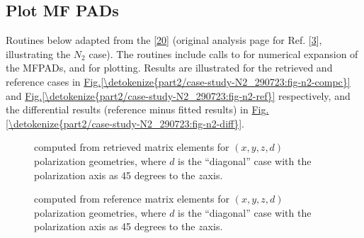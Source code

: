 \documentclass[letterpaper,table,10pt,english]{jupyterBook}
\begin{document}
\subsection{Plot MF PADs}
\label{\detokenize{part2/case-study-OCS_290723:plot-mf-pads}}
\sphinxAtStartPar
Routines below adapted from the  {[}\hyperlink{cite.backmatter/bibliography:id681}{20}{]}  (original analysis page for Ref. {[}\hyperlink{cite.backmatter/bibliography:id686}{3}{]}, illustrating the \(N_2\) case). The routines include calls to  for numerical expansion of the MF\sphinxhyphen{}PADs, and  for plotting. Results are illustrated for the retrieved and reference cases in \hyperref[\detokenize{part2/case-study-N2_290723:fig-n2-compc}]{Fig.\@ \ref{\detokenize{part2/case-study-N2_290723:fig-n2-compc}}} and \hyperref[\detokenize{part2/case-study-N2_290723:fig-n2-ref}]{Fig.\@ \ref{\detokenize{part2/case-study-N2_290723:fig-n2-ref}}} respectively, and the differential results (reference minus fitted results) in \hyperref[\detokenize{part2/case-study-N2_290723:fig-n2-diff}]{Fig.\@ \ref{\detokenize{part2/case-study-N2_290723:fig-n2-diff}}}.

\begin{figure}[htbp]
\centering
\capstart

\noindent{}
\caption{{\hyperref[\detokenize{backmatter/glossary:term-MF}]{}} computed from retrieved matrix elements for \((x,y,z,d)\) polarization geometries, where \(d\) is the “diagonal” case with the polarization axis as 45 degrees to the \(z\)\sphinxhyphen{}axis.}\label{\detokenize{part2/case-study-OCS_290723:fig-ocs-compc}}\end{figure}

\begin{figure}[htbp]
\centering
\capstart

\noindent{}
\caption{{\hyperref[\detokenize{backmatter/glossary:term-MF}]{}} computed from reference  matrix elements for \((x,y,z,d)\) polarization geometries, where \(d\) is the “diagonal” case with the polarization axis as 45 degrees to the \(z\)\sphinxhyphen{}axis.}\label{\detokenize{part2/case-study-OCS_290723:fig-ocs-ref}}\end{figure}
\end{document}
